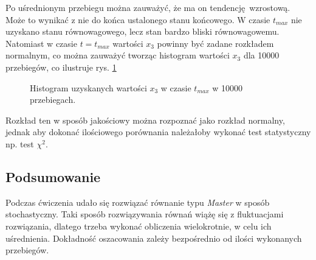 \documentclass[a4paper,12pt]{article}
\begin{document}
\noaka Po uśrednionym przebiegu można zauważyć, że ma on tendencję wzrostową. 
Może to wynikać z nie do końca ustalonego stanu końcowego.
W czasie $t_{max}$ nie uzyskano stanu równowagowego, lecz stan bardzo bliski równowagowemu.
Natomiast w czasie $t = t_{max}$ wartości $x_3$ powinny być zadane rozkładem normalnym, co można zauważyć tworząc histogram wartości $x_3$ dla 10000 przebiegów, co ilustruje rys. \ref{fig:add2}

\begin{figure}[H]
	\centering
	
	\caption{Histogram uzyskanych wartości $x_3$ w czasie $t_{max}$ w 10000 przebiegach.}
	\label{fig:add2}
\end{figure} 

\noaka Rozkład ten w sposób jakościowy można rozpoznać jako rozkład normalny, jednak aby dokonać ilościowego porównania należałoby wykonać test statystyczny np. test $\chi^2$.
 
\subsection*{Podsumowanie}

Podczas ćwiczenia udało się rozwiązać równanie typu \textit{Master} w sposób stochastyczny.
Taki sposób rozwiązywania równań wiążę się z fluktuacjami rozwiązania, dlatego trzeba wykonać obliczenia wielokrotnie, w celu ich uśrednienia.
Dokładność oszacowania zależy bezpośrednio od ilości wykonanych przebiegów.
\end{document}
